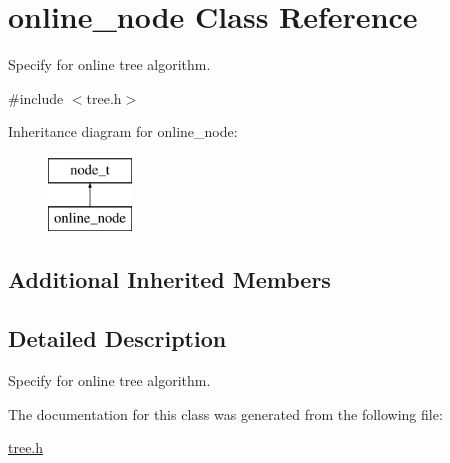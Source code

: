 \hypertarget{classonline__node}{\section{online\+\_\+node Class Reference}
\label{classonline__node}
}


Specify for online tree algorithm.  




{\ttfamily \#include $<$tree.\+h$>$}

Inheritance diagram for online\+\_\+node\+:\begin{figure}[H]
\begin{center}
\leavevmode
\includegraphics[height=2.000000cm]{classonline__node}
\end{center}
\end{figure}
\subsection*{Additional Inherited Members}


\subsection{Detailed Description}
Specify for online tree algorithm. 

The documentation for this class was generated from the following file\+:\begin{DoxyCompactItemize}
\item 
\hyperlink{tree_8h}{tree.\+h}\end{DoxyCompactItemize}
